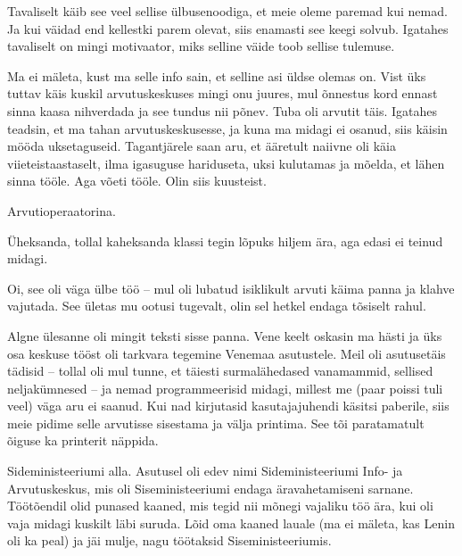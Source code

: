 
Tavaliselt käib see veel sellise ülbusenoodiga, et meie oleme 
paremad kui nemad. Ja kui väidad end kellestki parem olevat, siis 
enamasti see keegi solvub. Igatahes tavaliselt on mingi motivaator, miks 
selline väide toob sellise tulemuse. 


Ma ei mäleta, kust ma selle info sain, et selline asi üldse olemas on. Vist 
üks tuttav käis kuskil arvutuskeskuses mingi onu juures, mul õnnestus kord ennast 
sinna kaasa nihverdada ja see tundus nii põnev. Tuba oli arvutit täis. Igatahes 
teadsin, et ma tahan arvutuskeskusesse, ja kuna ma midagi ei osanud, siis 
käisin mööda uksetaguseid. Tagantjärele saan aru, et ääretult naiivne 
oli käia viieteistaastaselt, ilma igasuguse 
hariduseta, uksi kulutamas ja mõelda, et lähen sinna tööle. Aga võeti tööle. Olin siis kuusteist.


Arvutioperaatorina. 


Üheksanda, tollal kaheksanda klassi tegin lõpuks hiljem ära, aga edasi ei 
teinud midagi. 


Oi, see oli väga ülbe töö -- mul oli lubatud isiklikult 
arvuti käima panna ja klahve vajutada. See ületas mu ootusi tugevalt, olin sel 
hetkel endaga tõsiselt rahul. 

Algne ülesanne oli mingit teksti sisse panna. Vene keelt oskasin ma hästi ja 
üks osa keskuse tööst oli tarkvara tegemine Venemaa 
asutustele. Meil oli asutusetäis tädisid -- tollal oli mul tunne, et täiesti 
surmalähedased vanamammid, sellised neljakümnesed -- ja 
nemad programmeerisid midagi, millest me (paar 
poissi tuli veel) väga aru ei saanud. Kui nad kirjutasid kasutajajuhendi käsitsi paberile, siis meie pidime selle 
arvutisse sisestama ja välja printima. See tõi paratamatult õiguse ka
printerit näppida.


Sideministeeriumi alla. Asutusel oli edev nimi 
Sideministeeriumi Info- ja Arvutuskeskus, mis oli Siseministeeriumi endaga äravahetamiseni sarnane. 
Töötõendil olid punased kaaned, mis tegid nii mõnegi vajaliku 
töö ära, kui oli vaja midagi kuskilt läbi suruda. Lõid oma kaaned lauale (ma ei mäleta, kas Lenin oli ka peal)
ja jäi mulje, nagu töötaksid Siseministeeriumis. 


